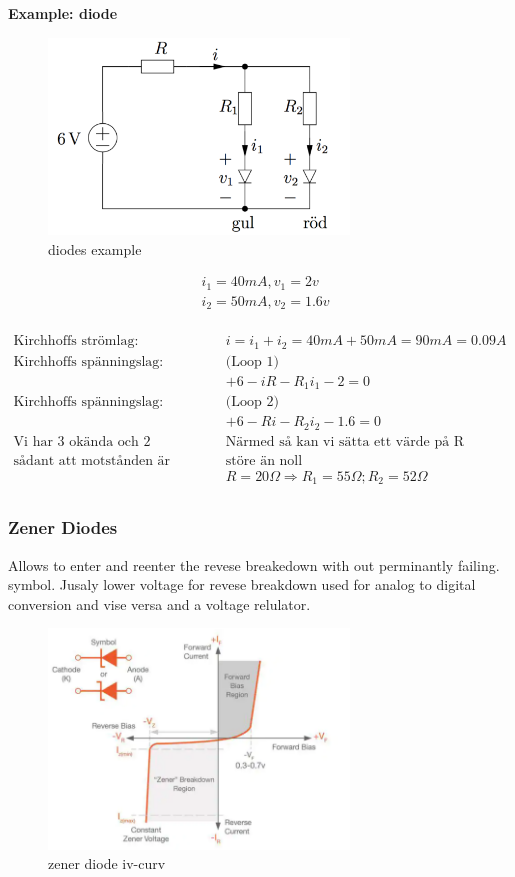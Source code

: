 \newpage
\textbf{Example: diode}
\begin{figure}[h]
    \centering
    \includegraphics[width=8cm]{image/example-diode.png}
    \caption{diodes example}
\end{figure}

\begin{align*}
    &i_1 = 40mA, v_1 = 2v \\
    &i_2 = 50mA, v_2 = 1.6v \\
\end{align*}

\begin{align*}
    \text{Kirchhoffs strömlag: }& i=i_1+i_2=40mA+50mA=90mA=0.09A \\
    \text{Kirchhoffs spänningslag: }& \text{(Loop 1)} \\
    &+6-iR-R_1i_1-2=0 \\
    \text{Kirchhoffs spänningslag: }& \text{(Loop 2)} \\
    &+6-Ri-R_2i_2-1.6=0 \\
    \text{Vi har 3 okända och 2 eqvationer.}
    &\text{Närmed så kan vi sätta ett värde på R} \\
    \text{sådant att motstånden är} &\text{störe än noll} \\
    &R=20\Omega \Rightarrow R_1 = 55\Omega; R_2 = 52\Omega \\
\end{align*}



\newpage
\subsubsection{Zener Diodes}
Allows to enter and reenter the revese breakedown with out perminantly failing.
symbol. Jusaly lower voltage for revese breakdown
used for analog to digital conversion and vise versa and a voltage relulator.
\begin{figure}[h]
    \centering
    \includegraphics[width=8cm]{image/zener-diode.png}
    \caption{zener diode iv-curv}
\end{figure}

